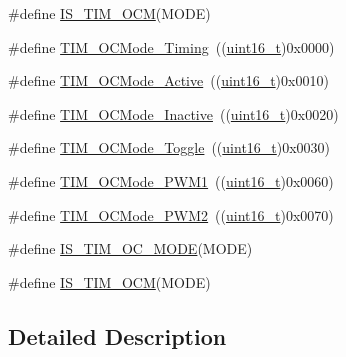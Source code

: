 \begin{DoxyCompactItemize}
\item 
\#define \hyperlink{group___t_i_m___output___compare__and___p_w_m__modes_ga45f530dd241d3b0787b5c2d62cd1b98f}{I\+S\+\_\+\+T\+I\+M\+\_\+\+O\+CM}(M\+O\+DE)
\item 
\#define \hyperlink{group___t_i_m___output___compare__and___p_w_m__modes_ga54d5745fade3b2f8ea1325e7447ca760}{T\+I\+M\+\_\+\+O\+C\+Mode\+\_\+\+Timing}~((\hyperlink{_p_e___types_8h_a1f1825b69244eb3ad2c7165ddc99c956}{uint16\+\_\+t})0x0000)
\item 
\#define \hyperlink{group___t_i_m___output___compare__and___p_w_m__modes_ga76bac57d41dc67218772f9c745c77102}{T\+I\+M\+\_\+\+O\+C\+Mode\+\_\+\+Active}~((\hyperlink{_p_e___types_8h_a1f1825b69244eb3ad2c7165ddc99c956}{uint16\+\_\+t})0x0010)
\item 
\#define \hyperlink{group___t_i_m___output___compare__and___p_w_m__modes_gae0c350d7adaea14a37cabc2ab762695f}{T\+I\+M\+\_\+\+O\+C\+Mode\+\_\+\+Inactive}~((\hyperlink{_p_e___types_8h_a1f1825b69244eb3ad2c7165ddc99c956}{uint16\+\_\+t})0x0020)
\item 
\#define \hyperlink{group___t_i_m___output___compare__and___p_w_m__modes_ga8b8adb6e81fe88bd14d44430f7f97021}{T\+I\+M\+\_\+\+O\+C\+Mode\+\_\+\+Toggle}~((\hyperlink{_p_e___types_8h_a1f1825b69244eb3ad2c7165ddc99c956}{uint16\+\_\+t})0x0030)
\item 
\#define \hyperlink{group___t_i_m___output___compare__and___p_w_m__modes_gaefbe32dddc9630fbcc48b302b50d15fc}{T\+I\+M\+\_\+\+O\+C\+Mode\+\_\+\+P\+W\+M1}~((\hyperlink{_p_e___types_8h_a1f1825b69244eb3ad2c7165ddc99c956}{uint16\+\_\+t})0x0060)
\item 
\#define \hyperlink{group___t_i_m___output___compare__and___p_w_m__modes_ga722d8f33a795ef82ed7ae76dfbb7613d}{T\+I\+M\+\_\+\+O\+C\+Mode\+\_\+\+P\+W\+M2}~((\hyperlink{_p_e___types_8h_a1f1825b69244eb3ad2c7165ddc99c956}{uint16\+\_\+t})0x0070)
\item 
\#define \hyperlink{group___t_i_m___output___compare__and___p_w_m__modes_ga93d898976e236c135bfd02a0c213c8ec}{I\+S\+\_\+\+T\+I\+M\+\_\+\+O\+C\+\_\+\+M\+O\+DE}(M\+O\+DE)
\item 
\#define \hyperlink{group___t_i_m___output___compare__and___p_w_m__modes_ga45f530dd241d3b0787b5c2d62cd1b98f}{I\+S\+\_\+\+T\+I\+M\+\_\+\+O\+CM}(M\+O\+DE)
\end{DoxyCompactItemize}


\subsection{Detailed Description}


